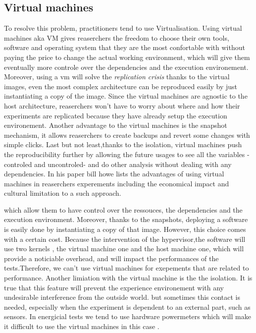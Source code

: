 \subsection{Virtual machines}
To resolve this problem, practitioners tend to use Virtualisation. Using virtual machines aka VM gives reaserchers the freedom to choose their own tools, software and operating system that they are the most confortable with without paying the price to change the actual working environment, which will give them eventually more controle over the dependencies and the execution environement. Moreover, using a vm will solve the \emph{replication crisis} thanks to the virtual images, even the most complex architecture can be reproduced easily by just instantiating a copy of the image. Since the virtual machines are agnostic to the host architecture, reaserchers won't have to worry about where and how their experiments are replicated because they have already setup the execution environement. Another advantage to the virtual machines is the snapshot mechanism, it allows reaserchers to create backups and revert some changes with simple clicks. Last but not least,thanks to the isolation, virtual machines push the reproducibility further by allowing the future usages to see all the variables -controled and uncontroled-  and do other analysis without dealing with any dependencies. In his paper \cite{howe_virtual_2012} bill howe lists the advantages of using virtual machines in reaserchers experements including the economical impact and cultural limitation to a such approach.

which allow them to have control over the ressouces, the dependencies and the execution environment. Moreover, thanks to the snapshots, deploying a software is easily done by instantiating a copy of that image.
However, this choice comes with a certain cost. Because the intervention of the hypervisor,the software will use two kernels , the virtual machine one and the host machine one, which will provide a noticiable overhead, and will impact the performances of the tests.Therefore, we can't use virtual machines for exepements that are related to performance. Another limiation with the virtual machine is the the isolation. It is true that this feature will prevent the experience environement with any undesirable interference from the outside world. but sometimes this contact is needed, especially when the experiment is dependent to an external part, such as sensors. In energicial tests we tend to use hardware powermeters which will make it difficult to use the virtual machines in this case .

